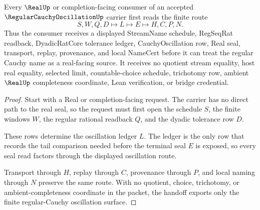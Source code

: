 \begin{theorem}
\label{thm:regular-cauchy-oscillation-real-handoff}
Every $\RealUp$ or completion-facing consumer of an accepted $\RegularCauchyOscillationUp$ carrier first reads the finite route
$$
S,W,Q,D \longmapsto L \longmapsto E \longmapsto H,C,P,N .
$$
Thus the consumer receives a displayed StreamName schedule, RegSeqRat readback, DyadicRatCore tolerance ledger, CauchyOscillation row, Real seal, transport, replay, provenance, and local NameCert before it can treat the regular Cauchy name as a real-facing source. It receives no quotient stream equality, host real equality, selected limit, countable-choice schedule, trichotomy row, ambient $\RealUp$ completeness coordinate, Lean verification, or bridge credential.
\end{theorem}
\begin{proof}
Start with a Real or completion-facing request. The carrier has no direct path to the real seal, so the request must first open the schedule $S$, the finite windows $W$, the regular rational readback $Q$, and the dyadic tolerance row $D$.

These rows determine the oscillation ledger $L$. The ledger is the only row that records the tail comparison needed before the terminal seal $E$ is exposed, so every seal read factors through the displayed oscillation route.

Transport through $H$, replay through $C$, provenance through $P$, and local naming through $N$ preserve the same route. With no quotient, choice, trichotomy, or ambient-completeness coordinate in the packet, the handoff exports only the finite regular-Cauchy oscillation surface.
\end{proof}



